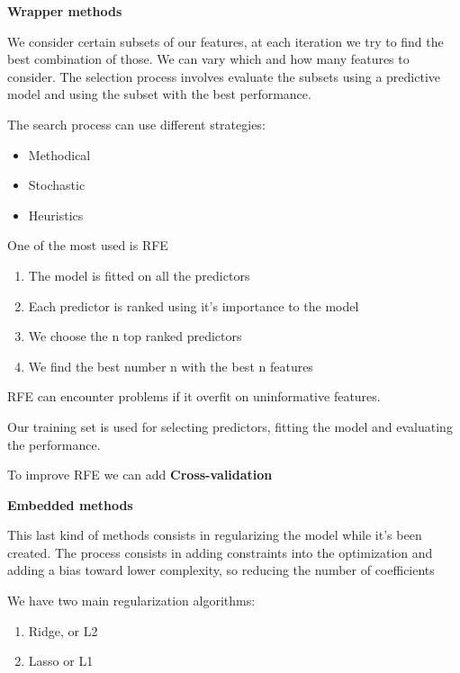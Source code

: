 \textbf{Wrapper methods}

We consider certain subsets of our features, at each iteration we try to find the best combination of those. We can vary which and how many features to consider. The selection process involves evaluate the subsets using a predictive model and using the subset with the best performance.

\vspace{10pt}

The search process can use different strategies:
\begin{itemize}
    \item Methodical
    \item Stochastic
    \item Heuristics
\end{itemize}

\vspace{10pt}

One of the most used is RFE
\begin{enumerate}
    \item The model is fitted on all the predictors
    \item Each predictor is ranked using it's importance to the model
    \item We choose the n top ranked predictors
    \item We find the best number n with the best n features
\end{enumerate}

RFE can encounter problems if it overfit on uninformative features.

\vspace{10pt}

Our training set is used for selecting predictors, fitting the model and evaluating the performance.

To improve RFE we can add \textbf{Cross-validation}

\vspace{10pt}

\textbf{Embedded methods}

This last kind of methods consists in regularizing the model while it's been created. The process consists in adding constraints into the optimization and adding a bias toward lower complexity, so reducing the number of coefficients

\vspace{10pt}

We have two main regularization algorithms:
\begin{enumerate}
    \item Ridge, or L2
    \item Lasso or L1
\end{enumerate}

